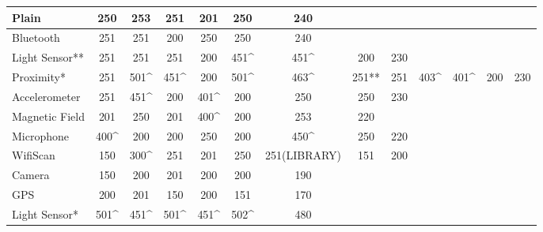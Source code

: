 \begin{table}
    \begin{tabular}{| l | c | c | c | c | c | c | c | c | c | c | c | c |}
    \hline
    Plain          & 250  & 253  & 251  & 201  & 250  & 240          & ~     & ~   & ~    & ~    & ~   & ~   \\\hline
    Bluetooth      & 251  & 251  & 200  & 250  & 250  & 240          & ~     & ~   & ~    & ~    & ~   & ~   \\\hline
    Light Sensor** & 251  & 251  & 251  & 200  & 451\^ & 451\^        & 200   & 230 & ~    & ~    & ~   & ~   \\ \hline
    Proximity*     & 251  & 501\^ & 451\^ & 200  & 501\^ & 463\^        & 251** & 251 & 403\^ & 401\^ & 200 & 230 \\ \hline
    Accelerometer  & 251  & 451\^ & 200  & 401\^ & 200  & 250          & 250   & 230 & ~    & ~    & ~   & ~   \\ \hline
    Magnetic Field & 201  & 250  & 201  & 400\^ & 200  & 253          & 220   & ~   & ~    & ~    & ~   & ~   \\ \hline
    Microphone     & 400\^ & 200  & 200  & 250  & 200  & 450\^        & 250   & 220 & ~    & ~    & ~   & ~   \\ \hline
    WifiScan       & 150  & 300\^ & 251  & 201  & 250  & 251(LIBRARY) & 151   & 200 & ~    & ~    & ~   & ~   \\ \hline
    Camera         & 150  & 200  & 201  & 200  & 200  & 190          & ~     & ~   & ~    & ~    & ~   & ~   \\ \hline
    GPS            & 200  & 201  & 150  & 200  & 151  & 170          & ~     & ~   & ~    & ~    & ~   & ~   \\ \hline
    Light Sensor*  & 501\^ & 451\^ & 501\^ & 451\^ & 502\^ & 480          & ~     & ~   & ~    & ~    & ~   & ~   \\ \hline
    \end{tabular}
\end{table}